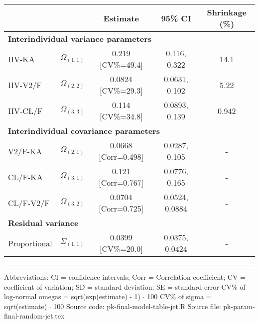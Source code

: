 \setlength{\tabcolsep}{5pt} 
\begin{threeparttable}
\renewcommand{\arraystretch}{1.3}
\begin{tabular}[h]{lcccc}
\hline
 &  & Estimate & 95\% CI & Shrinkage (\%) \\
\hline
\multicolumn{5}{l}{\textbf{Interindividual variance parameters}}\\%
IIV-KA & $\Omega_{(1,1)}$ & 0.219 [CV\%=49.4] & 0.116, 0.322 & 14.1 \\
IIV-V2/F & $\Omega_{(2,2)}$ & 0.0824 [CV\%=29.3] & 0.0631, 0.102 & 5.22 \\
IIV-CL/F & $\Omega_{(3,3)}$ & 0.114 [CV\%=34.8] & 0.0893, 0.139 & 0.942 \\
\hline \multicolumn{5}{l}{\textbf{Interindividual covariance parameters}}\\%
V2/F-KA & $\Omega_{(2,1)}$ & 0.0668 [Corr=0.498] & 0.0287, 0.105 & - \\
CL/F-KA & $\Omega_{(3,1)}$ & 0.121 [Corr=0.767] & 0.0776, 0.165 & - \\
CL/F-V2/F & $\Omega_{(3,2)}$ & 0.0704 [Corr=0.725] & 0.0524, 0.0884 & - \\
\hline \multicolumn{5}{l}{\textbf{Residual variance}}\\%
Proportional & $\Sigma_{(1,1)}$ & 0.0399 [CV\%=20.0] & 0.0375, 0.0424 & - \\
\hline
\end{tabular}
\end{threeparttable}
\vskip 0.67cm
\begin{minipage}{1\linewidth}
\linespread{1.1}\selectfont
\rule{1\linewidth}{0.4pt}
\vskip 0.02cm
Abbreviations: CI = confidence intervals; 
                        Corr = Correlation coefficient;
                        CV = coefficient of variation;
                        SD = standard deviation;
                        SE = standard error \newline
CV\% of log-normal omegas = sqrt(exp(estimate) - 1) $\cdot$ 100 \newline
CV\% of sigma = sqrt(estimate) $\cdot$ 100 \newline
Source code: pk-final-model-table-jet.R \newline
Source file: pk-param-final-random-jet.tex \newline
\end{minipage}
